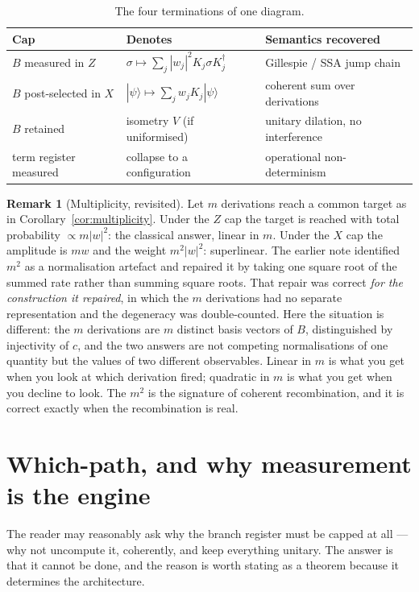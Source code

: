 \documentclass[11pt]{article}
\theoremstyle{definition}
\newtheorem{remark}[definition]{Remark}
\theoremstyle{plain}
\newcommand{\ket}[1]{| #1 \rangle}
\begin{document}
\begin{table}[t]
\centering
\small
\begin{tabular}{@{}lll@{}}
\toprule
\textbf{Cap} & \textbf{Denotes} & \textbf{Semantics recovered} \\
\midrule
$B$ measured in $Z$ & $\sigma \mapsto \sum_j |w_j|^2 K_j\sigma K_j^\dagger$ & Gillespie / SSA jump chain \\
$B$ post-selected in $X$ & $\ket{\psi}\mapsto \sum_j w_j K_j\ket{\psi}$ & coherent sum over derivations \\
$B$ retained & isometry $V$ (if uniformised) & unitary dilation, no interference \\
term register measured & collapse to a configuration & operational non-determinism \\
\bottomrule
\end{tabular}
\caption{The four terminations of one diagram.}\label{tab:caps}
\end{table}

\begin{remark}[Multiplicity, revisited]\label{rem:mult}
Let $m$ derivations reach a common target as in Corollary~\ref{cor:multiplicity}. Under the $Z$
cap the target is reached with total probability $\propto m|w|^2$: the classical answer, linear
in $m$. Under the $X$ cap the amplitude is $mw$ and the weight $m^2|w|^2$: superlinear.
The earlier note identified $m^2$ as a normalisation artefact and repaired it by taking one
square root of the summed rate rather than summing square roots. That repair was correct
\emph{for the construction it repaired}, in which the $m$ derivations had no separate
representation and the degeneracy was double-counted. Here the situation is different: the $m$
derivations are $m$ distinct basis vectors of $B$, distinguished by injectivity of $c$, and the
two answers are not competing normalisations of one quantity but the values of two different
observables. Linear in $m$ is what you get when you look at which derivation fired; quadratic in
$m$ is what you get when you decline to look. The $m^2$ is the signature of coherent
recombination, and it is correct exactly when the recombination is real.
\end{remark}

\section{Which-path, and why measurement is the engine}\label{sec:whichpath}

The reader may reasonably ask why the branch register must be capped at all --- why not
uncompute it, coherently, and keep everything unitary. The answer is that it cannot be done, and
the reason is worth stating as a theorem because it determines the architecture.
\end{document}
